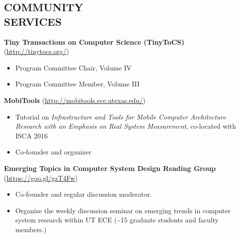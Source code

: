 \documentclass[margin, 9pt]{res} %
\begin{document}
\begin{resume}

\section{COMMUNITY\\ SERVICES}

\textbf{Tiny Transactions on Computer Science (TinyToCS)} (\url{http://tinytocs.org/})
\begin{itemize}[leftmargin=*] \itemsep -3pt
\vspace*{-4pt}
	\item Program Committee Chair, Volume IV \par
	\item Program Committee Member, Volume III \par
\end{itemize}

\medskip
\textbf{MobiTools} (\url{http://mobitools.ece.utexas.edu/})
\begin{itemize}[leftmargin=*] \itemsep -3pt
\vspace*{-4pt}
	\item Tutorial on \textit{Infrastructure and Tools for Mobile Computer Architecture Research with an Emphasis on Real System Measurement}, co-located with ISCA 2016\par
	\item Co-founder and organizer \par
\end{itemize}

\medskip
\medskip
\textbf{Emerging Topics in Computer System Design Reading Group} (\url{https://goo.gl/gzT4Fw})\\
\vspace*{-10pt}
\begin{itemize}[leftmargin=*] \itemsep -3pt
\vspace*{-5pt}
	\item Co-founder and regular discussion moderator. \par
	\item Organize the weekly discussion seminar on emerging trends in computer system research within UT ECE (\textasciitilde 15 graduate students and faculty members.) \par
\end{itemize}


\end{resume}
\end{document}
